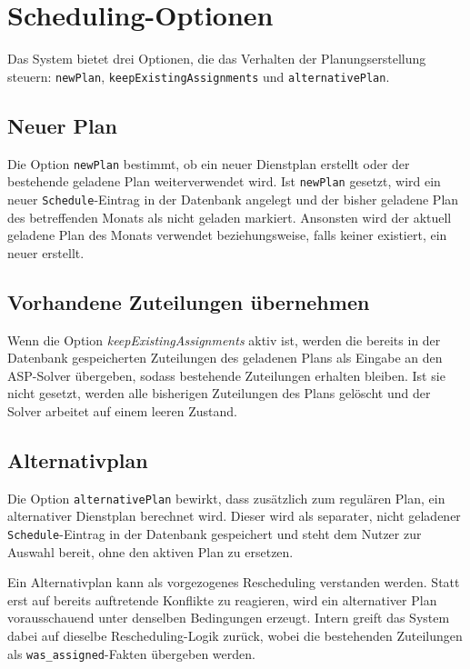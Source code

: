 \section{Scheduling-Optionen}

Das System bietet drei Optionen, die das Verhalten der Planungserstellung steuern:
\texttt{newPlan}, \texttt{keepExistingAssignments} und \texttt{alternativePlan}.

\subsection{Neuer Plan}

Die Option \texttt{newPlan} bestimmt, ob ein neuer Dienstplan erstellt oder der
bestehende geladene Plan weiterverwendet wird. Ist \texttt{newPlan} gesetzt, wird
ein neuer \texttt{Schedule}-Eintrag in der Datenbank angelegt und der bisher
geladene Plan des betreffenden Monats als nicht geladen markiert. Ansonsten
wird der aktuell geladene Plan des Monats verwendet beziehungsweise, falls keiner existiert,
ein neuer erstellt.

\subsection{Vorhandene Zuteilungen übernehmen}

 Wenn die Option \textit{keepExistingAssignments} aktiv ist, werden die bereits in der Datenbank gespeicherten Zuteilungen des geladenen Plans als Eingabe an den ASP-Solver übergeben, sodass
bestehende Zuteilungen erhalten bleiben. Ist sie nicht gesetzt, werden alle
bisherigen Zuteilungen des Plans gelöscht und der Solver arbeitet auf einem leeren
Zustand.

\subsection{Alternativplan} \label{sub:alternativplan}

Die Option \texttt{alternativePlan} bewirkt, dass zusätzlich zum
regulären Plan, ein alternativer Dienstplan berechnet wird. Dieser wird als
separater, nicht geladener \texttt{Schedule}-Eintrag in der Datenbank gespeichert
und steht dem Nutzer zur Auswahl bereit, ohne den aktiven Plan zu ersetzen.

Ein Alternativplan kann als vorgezogenes Rescheduling verstanden werden. Statt erst auf bereits auftretende Konflikte zu reagieren, wird ein alternativer Plan vorausschauend unter denselben Bedingungen erzeugt. Intern greift das System dabei auf dieselbe Rescheduling-Logik zurück, wobei die bestehenden Zuteilungen als \texttt{was\_assigned}-Fakten übergeben werden.

